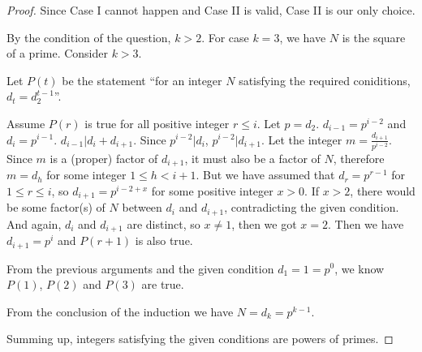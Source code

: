 \begin{proof}
\hspace{3em}

Since Case I cannot happen and Case II is valid, Case II is our only choice.

\hspace{3em}

By the condition of the question, $k > 2$. For case $k = 3$, we have $N$ is the square of a prime. Consider $k > 3$.

\hspace{3em}

Let $P(t)$ be the statement ``for an integer $N$ satisfying the required coniditions, $d_t = d_2^{t-1}$''. 

\hspace{3em}

Assume $P(r)$ is true for all positive integer $r \le i$. Let $p = d_2$. $d_{i-1} = p^{i-2}$ and $d_i = p^{i-1}$. $d_{i-1} | d_i + d_{i+1}$. Since $p^{i-2} | d_i$, $p^{i-2} | d_{i+1}$. Let the integer $m = \frac{d_{i+1}}{p^{i-2}}$. Since $m$ is a (proper) factor of $d_{i+1}$, it must also be a factor of $N$, therefore $m = d_h$ for some integer $1 \le h < i+1$. But we have assumed that $d_r = p^{r-1}$ for $1 \le r \le i$, so $d_{i+1} = p^{i-2+x}$ for some positive integer $x > 0$. If $x > 2$, there would be some factor(s) of $N$ between $d_i$ and $d_{i+1}$, contradicting the given condition. And again, $d_i$ and $d_{i+1}$ are distinct, so $x \ne 1$, then we got $x = 2$. Then we have $d_{i+1} = p^i$ and $P(r+1)$ is also true.

\hspace{3em}

From the previous arguments and the given condition $d_1 = 1 = p^0$, we know $P(1)$, $P(2)$ and $P(3)$ are true. 

\hspace{3em}

From the conclusion of the induction we have $ N = d_k = p^{k-1} $.

\hspace{3em}

Summing up, integers satisfying the given conditions are powers of primes.

\end{proof}
